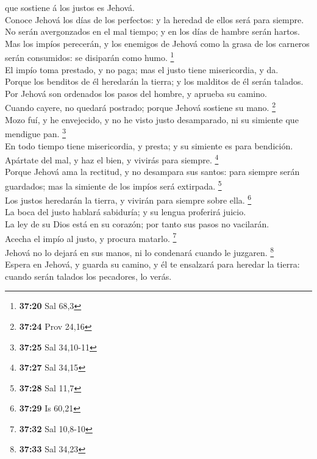 que sostiene á los justos es Jehová.\\
 Conoce Jehová los días de los perfectos: y la heredad de
ellos será para siempre.\\
 No serán avergonzados en el mal tiempo; y en los días de
hambre serán hartos.\\
 Mas los impíos perecerán, y los enemigos de Jehová como la
grasa de los carneros serán consumidos: se disiparán como humo.
\footnote{\textbf{37:20} Sal 68,3}\\
 El impío toma prestado, y no paga; mas el justo tiene
misericordia, y da.\\
 Porque los benditos de él heredarán la tierra; y los
malditos de él serán talados.\\
 Por Jehová son ordenados los pasos del hombre, y aprueba
su camino.\\
 Cuando cayere, no quedará postrado; porque Jehová sostiene
su mano. \footnote{\textbf{37:24} Prov 24,16}\\
 Mozo fuí, y he envejecido, y no he visto justo
desamparado, ni su simiente que mendigue pan. \footnote{\textbf{37:25}
  Sal 34,10-11}\\
 En todo tiempo tiene misericordia, y presta; y su simiente
es para bendición.\\
 Apártate del mal, y haz el bien, y vivirás para siempre.
\footnote{\textbf{37:27} Sal 34,15}\\
 Porque Jehová ama la rectitud, y no desampara sus santos:
para siempre serán guardados; mas la simiente de los impíos será
extirpada. \footnote{\textbf{37:28} Sal 11,7}\\
 Los justos heredarán la tierra, y vivirán para siempre
sobre ella. \footnote{\textbf{37:29} Is 60,21}\\
 La boca del justo hablará sabiduría; y su lengua proferirá
juicio.\\
 La ley de su Dios está en su corazón; por tanto sus pasos
no vacilarán.\\
 Acecha el impío al justo, y procura matarlo. \footnote{\textbf{37:32}
  Sal 10,8-10}\\
 Jehová no lo dejará en sus manos, ni lo condenará cuando
le juzgaren. \footnote{\textbf{37:33} Sal 34,23}\\
 Espera en Jehová, y guarda su camino, y él te ensalzará
para heredar la tierra: cuando serán talados los pecadores, lo verás.
